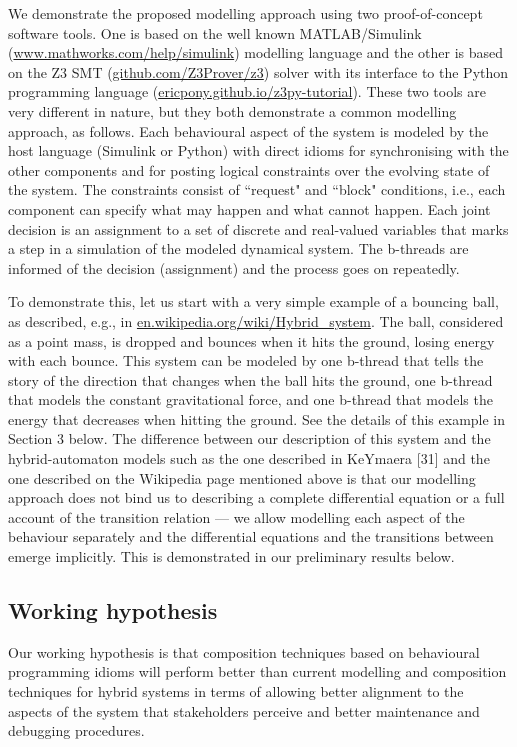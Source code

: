 \documentclass[11pt]{article}
\newcounter{example}
\begin{document}
We demonstrate the proposed modelling approach using two proof-of-concept software tools. One is based on the well known MATLAB/Simulink (\url{www.mathworks.com/help/simulink}) modelling language and the other is based on the Z3 SMT (\url{github.com/Z3Prover/z3}) solver  with its interface to the Python programming language (\url{ericpony.github.io/z3py-tutorial}). These two tools are very different in nature, but they both demonstrate a common modelling approach, as follows. Each behavioural aspect of the system is modeled by the host language (Simulink or Python) with direct idioms for synchronising with the other components and for posting logical constraints over the evolving state of the system. The constraints consist of ``request" and ``block" conditions, i.e., each component can specify what may happen and what cannot happen. Each joint decision is an assignment to a set of discrete and real-valued variables that marks a step in a simulation of the modeled dynamical system. The b-threads are informed of the decision (assignment) and the process goes on repeatedly.	

To demonstrate this, let us start with a very simple example of a bouncing ball, as described, e.g., in \url{en.wikipedia.org/wiki/Hybrid_system}. The ball, considered as a point mass, is dropped and bounces when it hits the ground, losing energy with each bounce. This system can be modeled by one b-thread that tells the story of the direction that changes when the ball hits the ground, one b-thread that models the constant gravitational force, and one b-thread that models the energy that decreases when hitting the ground. See the details of this example in Section 3 below. The difference between our description of this system and the hybrid-automaton models such as the one  described in KeYmaera [31]  and the one described on the Wikipedia page mentioned above is that our modelling approach does not bind us to describing a complete differential equation or a full account of the transition relation --- we allow modelling each aspect of the behaviour separately and the differential equations and the transitions between emerge implicitly. This is demonstrated in our preliminary results below.

\subsection{Working hypothesis}

Our working hypothesis is that composition techniques based on behavioural programming idioms will perform better than current modelling and composition techniques for hybrid systems in terms of allowing better alignment to the aspects of the system that stakeholders perceive and better maintenance and debugging procedures.
\end{document}
